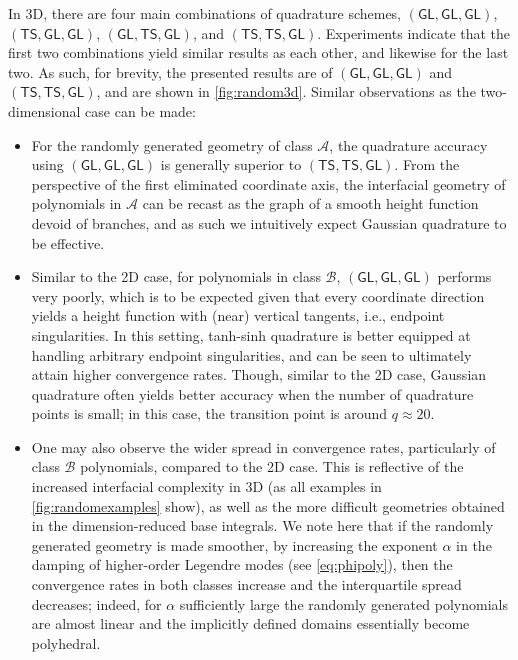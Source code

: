 \documentclass[onefignum,onetabnum,onealgnum,oneeqnum]{siamart190516}
\begin{document}
In 3D, there are four main combinations of quadrature schemes,  $(\mathsf{GL},\mathsf{GL},\mathsf{GL})$, $(\mathsf{TS},\mathsf{GL},\mathsf{GL})$, $(\mathsf{GL},\mathsf{TS},\mathsf{GL})$, and $(\mathsf{TS},\mathsf{TS},\mathsf{GL})$. Experiments indicate that the first two combinations yield similar results as each other, and likewise for the last two. As such, for brevity, the presented results are of $(\mathsf{GL},\mathsf{GL},\mathsf{GL})$ and $(\mathsf{TS},\mathsf{TS},\mathsf{GL})$, and are shown in \cref{fig:random3d}. Similar observations as the two-dimensional case can be made:
\begin{itemize}
\item For the randomly generated geometry of class $\mathcal A$, the quadrature accuracy using $(\mathsf{GL},\mathsf{GL},\mathsf{GL})$ is generally superior to $(\mathsf{TS},\mathsf{TS},\mathsf{GL})$. From the perspective of the first eliminated coordinate axis, the interfacial geometry of polynomials in $\mathcal A$ can be recast as the graph of a smooth height function devoid of branches, and as such we intuitively expect Gaussian quadrature to be effective. %
\item Similar to the 2D case, for polynomials in class $\mathcal B$, $(\mathsf{GL},\mathsf{GL},\mathsf{GL})$ performs very poorly, which is to be expected given that every coordinate direction yields a height function with (near) vertical tangents, i.e., endpoint singularities. In this setting, tanh-sinh quadrature is better equipped at handling arbitrary endpoint singularities, and can be seen to ultimately attain higher convergence rates. Though, similar to the 2D case, Gaussian quadrature often yields better accuracy when the number of quadrature points is small; in this case, the transition point is around $q \approx 20$. 
\item One may also observe the wider spread in convergence rates, particularly of class $\mathcal B$ polynomials, compared to the 2D case. This is reflective of the increased interfacial complexity in 3D (as all examples in \cref{fig:randomexamples} show), as well as the more difficult geometries obtained in the dimension-reduced base integrals. We note here that if the randomly generated geometry is made smoother, by increasing the exponent $\alpha$ in the damping of higher-order Legendre modes (see \cref{eq:phipoly}), then the convergence rates in both classes increase and the interquartile spread decreases; indeed, for $\alpha$ sufficiently large the randomly generated polynomials are almost linear and the implicitly defined domains essentially become polyhedral.
\end{itemize}
\end{document}
